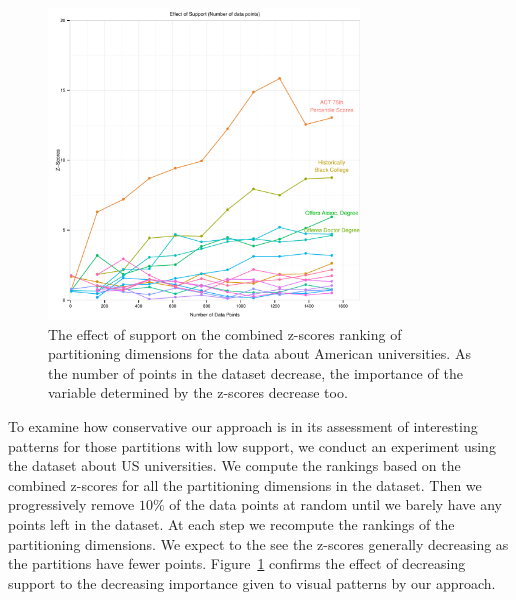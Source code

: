 \begin{figure}
\centering
\includegraphics[width=3.25in,height=3.25in]{images/support.pdf}
  \caption{The effect of support on the combined z-scores ranking of partitioning dimensions for the data about American universities. As the number of points in the dataset decrease, the importance of the variable determined by the z-scores decrease too. }
 \label{fig:support}
\end{figure}
To examine how conservative our approach is in its assessment of interesting patterns for those partitions with low support, we conduct an experiment using the dataset about US universities. We compute the rankings based on the combined z-scores for all the partitioning dimensions in the dataset. Then we progressively remove $10\%$ of the data points at random until we barely have any points left in the dataset. At each step we recompute the rankings of the partitioning dimensions. We expect to the see the z-scores generally decreasing as the partitions have fewer points. Figure~\ref{fig:support} confirms the effect of decreasing support to the decreasing importance given to visual patterns by our approach.

